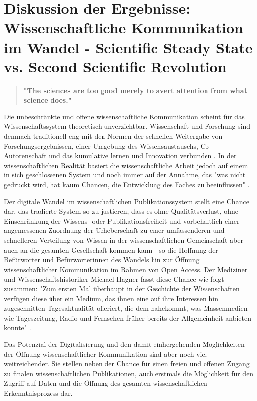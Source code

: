 \chapter{Diskussion der Ergebnisse: Wissenschaftliche Kommunikation im Wandel - Scientific Steady State vs. Second Scientific Revolution}

\begin{quote}
\textbf{"The sciences are too good merely to avert attention from what science does."}
\end{quote} \cite{kittler_2004}

Die unbeschränkte und offene wissenschaftliche Kommunikation scheint für das Wissenschaftssystem theoretisch unverzichtbar. Wissenschaft und Forschung sind demnach traditionell eng mit den Normen der schnellen Weitergabe von Forschungsergebnissen, einer Umgebung des Wissensaustauschs, Co-Autorenschaft und das kumulative lernen und Innovation verbunden \cite{Partha_1994_economics_science}. In der wissenschaftlichen Realität basiert die wissenschaftliche Arbeit jedoch auf einem in sich geschlossenen System und noch immer auf der Annahme, das "was nicht gedruckt wird, hat kaum Chancen, die Entwicklung des Faches zu beeinflussen" \cite{luhmann_1997_gesellschaft}.

Der digitale Wandel im wissenschaftlichen Publikationssystem stellt eine Chance dar, das tradierte System so zu justieren, dass es ohne Qualitätsverlust, ohne Einschränkung der Wissens- oder Publikationsfreiheit und vorbehaltlich einer angemessenen Zuordnung der Urheberschaft zu einer umfassenderen und schnelleren Verteilung von Wissen in der wissenschaftlichen Gemeinschaft aber auch an die gesamten Gesellschaft kommen kann - so die Hoffnung der Befürworter und Befürworterinnen des Wandels hin zur Öffnung wissenschaftlicher Kommunikation im Rahmen von Open Access. Der Mediziner und Wissenschaftshistoriker Michael Hagner fasst diese Chance wie folgt zusammen: "Zum ersten Mal überhaupt in der Geschichte der Wissenschaften verfügen diese über ein Medium, das ihnen eine auf ihre Interessen hin zugeschnitten Tagesaktualität offeriert, die dem nahekommt, was Massenmedien wie Tageszeitung, Radio und Fernsehen früher bereits der Allgemeinheit anbieten konnte" \cite{hagner_2015_sache_buches}.

Das Potenzial der Digitalisierung und den damit einhergehenden Möglichkeiten der Öffnung wissenschaftlicher Kommunikation sind aber noch viel weitreichender. Sie stellen neben der Chance für einen freien und offenen Zugang zu finalen wissenschaftlichen Publikationen, auch erstmals die Möglichkeit für den Zugriff auf Daten und die Öffnung des gesamten wissenschaftlichen Erkenntnisprozess dar.

